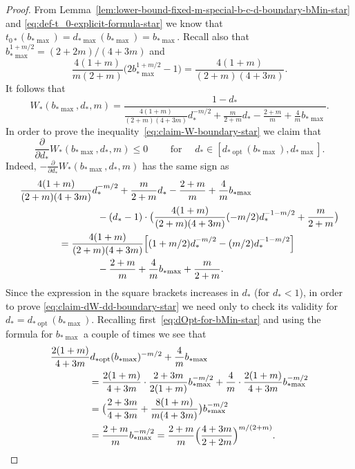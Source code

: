 \documentclass[a4paper]{amsart} %
\theoremstyle{definition}
\theoremstyle{remark}
\numberwithin{equation}{section}
\newcommand*{\dStar}{d_*}
\newcommand*{\tZeroStar}{t_{0*}}
\newcommand*{\XXXspecialbdStar}{W_*}
\newcommand*{\bMaxStar}{b_{*\!\max}}
\newcommand*{\dMaxStar}{d_{*\!\max}}
\newcommand*{\dOptStar}{d_{*\!\operatorname{opt}}}
\begin{document}
\begin{proof}
	From Lemma~\ref{lem:lower-bound-fixed-m-special-b-c-d-boundary-bMin-star}
	and \eqref{eq:def-t_0-explicit-formula-star}
	we know that $\tZeroStar(\bMaxStar) = \dMaxStar(\bMaxStar) = \bMaxStar$.
	Recall also that $\bMaxStar^{1+m/2} = (2+2m)/(4+3m)$ and
	\[
	\frac{4(1+m)}{m(2+m)}\bigl(2\bMaxStar^{1+m/2}  - 1\bigr) = 
	\frac{4(1+m)}{(2+m)(4+3m)}.
	\]
	It follows that
	\[
	\XXXspecialbdStar(\bMaxStar,\dStar,m)= \frac{1-\dStar}{
		\frac{4(1+m)}{(2+m)(4+3m)}\dStar^{-m/2} +\frac{m}{2+m}\dStar - \frac{2+m}{m} + \frac{4}{m} \bMaxStar}.
	\]
	In order to prove the inequality~\eqref{eq:claim-W-boundary-star} 
	we claim that
	\begin{equation}
	\label{eq:claim-dW-dd-boundary-star}
	\frac{\partial }{\partial \dStar} \XXXspecialbdStar(\bMaxStar, \dStar , m) \leq 0  \qquad\text{ for } \quad \dStar \in [\dOptStar(\bMaxStar), \dMaxStar].
	\end{equation}
	Indeed, 
	$-\frac{\partial }{\partial \dStar} \XXXspecialbdStar(\bMaxStar, \dStar , m)$
	has the same sign as
	\begin{align*}
	\MoveEqLeft[4]
	\frac{4(1+m)}{(2+m)(4+3m)}\dStar^{-m/2} +\frac{m}{2+m}\dStar -\frac{2+m}{m} + \frac{4}{m} \bMaxStar\\
	&\qquad \qquad -(\dStar-1)\cdot\bigl(\frac{4(1+m)}{(2+m)(4+3m)}(-m/2)\dStar^{-1-m/2} +\frac{m}{2+m}\bigr)\\
	&= \frac{4(1+m)}{(2+m)(4+3m)}\Bigl[ (1+m/2)\dStar^{-m/2} 
	- (m/2)\dStar^{-1-m/2} \Bigr]\\
	&\qquad\qquad
	- \frac{2+m}{m} + \frac{4}{m} \bMaxStar+ \frac{m}{2+m}.
	\end{align*}
	Since the expression in the square brackets increases in $\dStar$ (for $\dStar <1$),
	in order to prove \eqref{eq:claim-dW-dd-boundary-star} we need only to check its validity for $\dStar = \dOptStar(\bMaxStar)$.	
	Recalling first~\eqref{eq:dOpt-for-bMin-star}
	and using the formula for $\bMaxStar$ a couple of times we see that
	\begin{align*}
	\MoveEqLeft[4]
	\frac{2(1+m)}{4+3m}\dOptStar(\bMaxStar)^{-m/2} 
	+ \frac{4}{m} \bMaxStar \\
	&=\frac{2(1+m)}{4+3m}\cdot
	\frac{2+3m}{2(1+m)}\bMaxStar^{-m/2} 
	+ \frac{4}{m} \cdot\frac{2(1+m)}{4+3m}\bMaxStar^{-m/2}\\
	&= \bigl(  \frac{2+3m}{4+3m} + \frac{8(1+m)}{m(4+3m)}\bigr)\bMaxStar^{-m/2}\\
	&= \frac{2+m}{m}\bMaxStar^{-m/2} 
	= \frac{2+m}{m}\Bigl(\frac{4+3m}{2+2m}\Bigr)^{m/(2+m)}.

\end{align*}
\end{proof}
\end{document}
